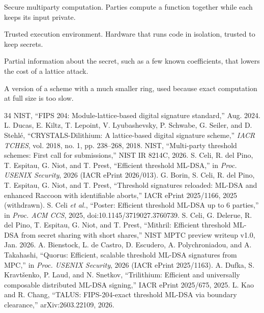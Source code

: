 \documentclass[10pt,conference,a4paper]{IEEEtran}
\begin{document}
\begin{list}{}{\setlength{\leftmargin}{1em}\setlength{\itemindent}{-1em}\setlength{\labelwidth}{0pt}%
  \setlength{\labelsep}{0.4em}\setlength{\itemsep}{1pt}\setlength{\parsep}{0pt}\let\makelabel\glossterm}
\item[MPC.] Secure multiparty computation. Parties compute a function together while each keeps its input private.
\item[TEE.] Trusted execution environment. Hardware that runs code in isolation, trusted to keep secrets.
\item[Hint (lattice).] Partial information about the secret, such as a few known coefficients, that lowers the cost of a
lattice attack.
\item[Toy size.] A version of a scheme with a much smaller ring, used because exact computation at full size is too slow.
\end{list}

\begin{thebibliography}{34}\footnotesize
{} NIST, ``FIPS 204: Module-lattice-based digital signature standard,'' Aug. 2024.
 L. Ducas, E. Kiltz, T. Lepoint, V. Lyubashevsky, P. Schwabe, G. Seiler, and D. Stehl\'e, ``CRYSTALS-Dilithium: A lattice-based digital signature scheme,'' \emph{IACR TCHES}, vol. 2018, no. 1, pp. 238--268, 2018.
 NIST, ``Multi-party threshold schemes: First call for submissions,'' NIST IR 8214C, 2026.
 S. Celi, R. del Pino, T. Espitau, G. Niot, and T. Prest, ``Efficient threshold ML-DSA,'' in \emph{Proc. USENIX Security}, 2026 (IACR ePrint 2026/013).
 G. Borin, S. Celi, R. del Pino, T. Espitau, G. Niot, and T. Prest, ``Threshold signatures reloaded: ML-DSA and enhanced Raccoon with identifiable aborts,'' IACR ePrint 2025/1166, 2025 (withdrawn).
 S. Celi \emph{et al.}, ``Poster: Efficient threshold ML-DSA up to 6 parties,'' in \emph{Proc. ACM CCS}, 2025, doi:10.1145/3719027.3760739.
 S. Celi, G. Delerue, R. del Pino, T. Espitau, G. Niot, and T. Prest, ``Mithril: Efficient threshold ML-DSA from secret sharing with short shares,'' NIST MPTC preview writeup v1.0, Jan. 2026.
 A. Bienstock, L. de Castro, D. Escudero, A. Polychroniadou, and A. Takahashi, ``Quorus: Efficient, scalable threshold ML-DSA signatures from MPC,'' in \emph{Proc. USENIX Security}, 2026 (IACR ePrint 2025/1163).
 A. Dufka, S. Kravt\v{s}enko, P. Laud, and N. Snetkov, ``Trilithium: Efficient and universally composable distributed ML-DSA signing,'' IACR ePrint 2025/675, 2025.
 L. Kao and R. Chang, ``TALUS: FIPS-204-exact threshold ML-DSA via boundary clearance,'' arXiv:2603.22109, 2026.

\end{thebibliography}
\end{document}
